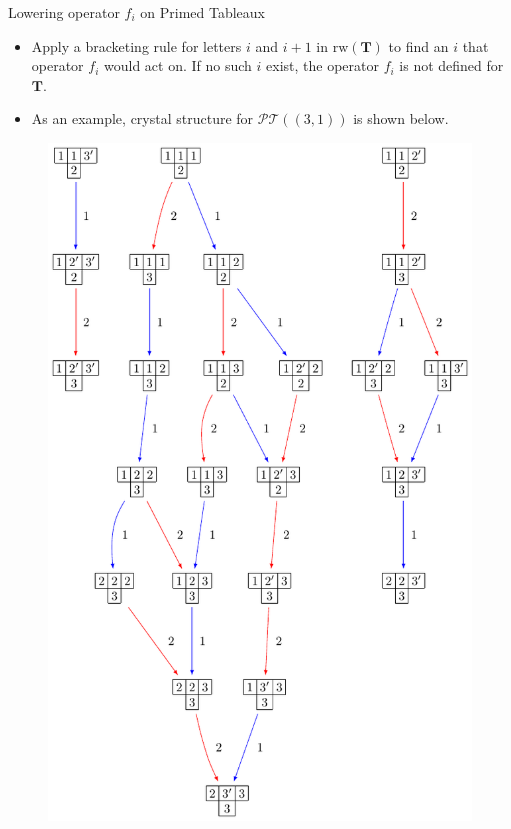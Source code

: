 \documentclass[final]{beamer}
\newlength{\onecolwid}
\begin{document}
\begin{frame}[t]
\begin{columns}[t]
\begin{column}{\onecolwid}
\begin{block}{Lowering operator $f_i$ on Primed Tableaux}
\begin{itemize}
\item Apply a bracketing rule for letters $i$ and $i+1$ in $\mathrm{rw}(\mathbf{T})$ to find an $i$ that operator $f_i$ would act on. If no such $i$ exist, the operator $f_i$ is not defined for $\mathbf{T}$.

\item As an example, crystal structure for $\mathcal{PT} ((3,1))$ is shown below.
\end{itemize}


\begin{figure}
\includegraphics[scale=1.55]{Crystal_Shifted}
\centering
\end{figure}


\end{block}
\end{column}
\end{columns}
\end{frame}
\end{document}
